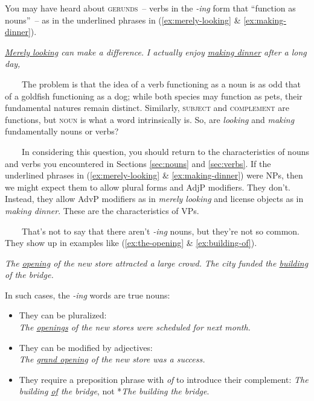 \begin{tcolorbox}[title=What about gerunds?\is{gerund@``gerund''}, colback=white]

You may have heard about \textsc{gerunds}~-- verbs in the \textit{-ing} form that ``function as nouns''~-- as in the underlined phrases in (\ref{ex:merely-looking} \& \ref{ex:making-dinner}).

\ea\textit{\uline{Merely looking} can make a difference.}\label{ex:merely-looking}
\ex\textit{I actually enjoy \uline{making dinner} after a long day,} \label{ex:making-dinner}
\z

~~~~The problem is that the idea of a verb functioning as a noun is as odd that of a goldfish functioning as a dog; while both species may function as pets, their fundamental natures remain distinct. Similarly, \textsc{subject} and \textsc{complement} are functions, but \textsc{noun} is what a word intrinsically is. So, are \textit{looking} and \textit{making} fundamentally nouns or verbs?

~~~~In considering this question, you should return to the characteristics of nouns and verbs you encountered in Sections \ref{sec:nouns} and \ref{sec:verbs}. If the underlined phrases in (\ref{ex:merely-looking} \& \ref{ex:making-dinner}) were NPs, then we might expect them to allow plural forms and AdjP modifiers. They don't. Instead, they allow AdvP modifiers as in \textit{merely looking} and license objects as in \textit{making dinner}. These are the characteristics of VPs.

~~~~That's not to say that there aren't \textit{-ing} nouns, but they're not so common. They show up in examples like  (\ref{ex:the-opening} \& \ref{ex:building-of}).

\ea    \textit{The \uline{opening} of the new store attracted a large crowd.} \label{ex:the-opening}
\ex   \textit{The city funded the \uline{building} of the bridge.}\label{ex:building-of}
\z

In such cases, the \textit{-ing} words are true nouns:

\begin{itemize}[nosep]
    \item They can be pluralized: \\\textit{The \uline{openings} of the new stores were scheduled for next month.}
    \item They can be modified by adjectives: \\\textit{The \uline{grand opening} of the new store was a success.}
    \item They require a preposition phrase with \textit{of} to introduce their complement: \textit{The building \uline{of} the bridge}, not *\textit{The building the bridge}.
\end{itemize}


\end{tcolorbox}
